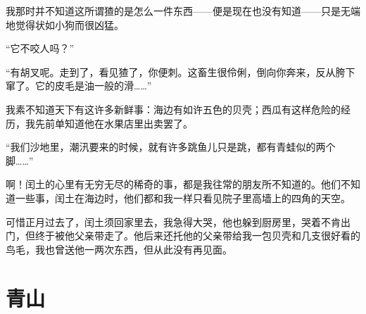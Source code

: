 \documentclass[12pt,UTF-8,openany]{ctexbook}
\begin{document}
\begin{large}
    我那时并不知道这所谓猹的是怎么一件东西——便是现在也没有知道——只是无端地觉得状如小狗而很凶猛。
    
    “它不咬人吗？”
    
    “有胡叉呢。走到了，看见猹了，你便刺。这畜生很伶俐，倒向你奔来，反从胯下窜了。它的皮毛是油一般的滑……”
    
    我素不知道天下有这许多新鲜事：海边有如许五色的贝壳；西瓜有这样危险的经历，我先前单知道他在水果店里出卖罢了。
    
    “我们沙地里，潮汛要来的时候，就有许多跳鱼儿只是跳，都有青蛙似的两个脚……”
    
    啊！闰土的心里有无穷无尽的稀奇的事，都是我往常的朋友所不知道的。他们不知道一些事，闰土在海边时，他们都和我一样只看见院子里高墙上的四角的天空。
    
    可惜正月过去了，闰土须回家里去，我急得大哭，他也躲到厨房里，哭着不肯出门，但终于被他父亲带走了。他后来还托他的父亲带给我一包贝壳和几支很好看的鸟毛，我也曾送他一两次东西，但从此没有再见面。
    
\end{large}



\chapter{青山}
\end{document}
